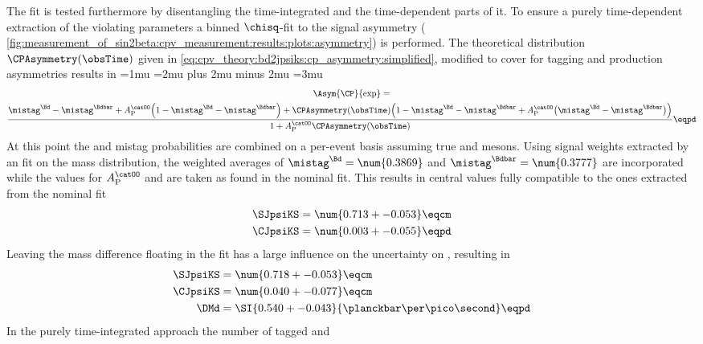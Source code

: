 The fit is tested furthermore by disentangling the time-integrated and the
time-dependent parts of it. To ensure a purely time-dependent extraction of the
\CP violating parameters a binned $\chisq$-fit to the signal \CP asymmetry (\cf
\cref{fig:measurement_of_sin2beta:cpv_measurement:results:plots:asymmetry}) is
performed. The theoretical distribution $\CPAsymmetry(\obsTime)$ given in
\cref{eq:cpv_theory:bd2jpsiks:cp_asymmetry:simplified}, modified to cover for
tagging and production asymmetries results in
%
\begingroup
  \thinmuskip=1mu
  \medmuskip=2mu plus 2mu minus 2mu
  \thickmuskip=3mu
\begin{multline}\raisetag{60pt}
  \Asym{\CP}{\text{exp}} = \\
    \frac{\mistag^{\Bd} - \mistag^{\Bdbar} + A_{\text{P}}^{\catOO} \Bigl(1 - \mistag^{\Bd} - \mistag^{\Bdbar}\Bigr) + \CPAsymmetry(\obsTime) \Bigl(1 - \mistag^{\Bd} - \mistag^{\Bdbar} + A_{\text{P}}^{\catOO} \bigl(\mistag^{\Bd} - \mistag^{\Bdbar}\bigr) \Bigr)}
    {1 + A_{\text{P}}^{\catOO} \CPAsymmetry(\obsTime) } \eqpd
\end{multline}
\endgroup
%
At this point the \OS and \SSpi mistag probabilities are combined on a per-event
basis assuming true \Bd and \Bdbar mesons. Using signal weights extracted by an
\sPlot fit on the mass distribution, the weighted averages of $\mistag^{\Bd} =
\num{0.3869}$ and $\mistag^{\Bdbar} = \num{0.3777}$ are incorporated while the
values for $A_{\text{P}}^{\catOO}$ and \DMd are taken as found in the nominal
fit. This results in central values fully compatible to the ones extracted from
the nominal fit
%
\begin{equation*}
  \begin{split}
    \SJpsiKS &= \num{0.713 +- 0.053} \eqcm \\
    \CJpsiKS &= \num{0.003 +- 0.055} \eqpd
  \end{split}
\end{equation*}
%
Leaving the mass difference \DMd floating in the fit has a large influence on
the uncertainty on \CJpsiKS, resulting in
%
\begin{equation*}
  \begin{split}
    \SJpsiKS &= \num{0.718 +- 0.053} \eqcm \\
    \CJpsiKS &= \num{0.040 +- 0.077} \eqcm \\
    \DMd     &= \SI{0.540 +- 0.043}{\planckbar\per\pico\second} \eqpd
  \end{split}
\end{equation*}
%
In the purely time-integrated approach the number of tagged \Bd and \Bdbar
